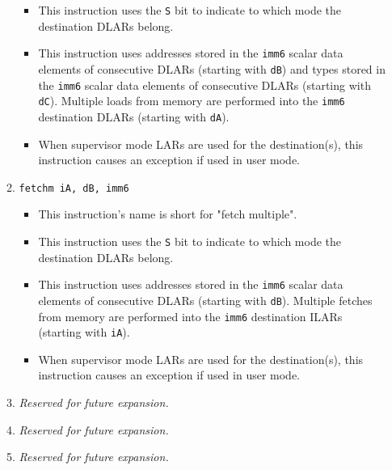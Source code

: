 \documentclass{article}
\begin{document}
\begin{itemize}
\begin{enumerate}
\begin{itemize}
				\item This instruction uses the \texttt{S} bit to indicate
					to which mode the destination DLARs belong.
				\item This instruction uses addresses stored in the
					\texttt{imm6} scalar data elements of consecutive DLARs
					(starting with \texttt{dB}) and types stored in the
					\texttt{imm6} scalar data elements of consecutive DLARs
					(starting with \texttt{dC}). Multiple loads from memory
					are performed into the \texttt{imm6} destination DLARs
					(starting with \texttt{dA}).
				\item When supervisor mode LARs are used for the
					destination(s), this instruction causes an exception if
					used in user mode.
				\end{itemize}

			\item \texttt{fetchm iA, dB, imm6}
				\begin{itemize}
				\item This instruction's name is short for "fetch
					multiple".
				\item This instruction uses the \texttt{S} bit to indicate
					to which mode the destination DLARs belong.
				\item This instruction uses addresses stored in the
					\texttt{imm6} scalar data elements of consecutive DLARs
					(starting with \texttt{dB}). Multiple fetches from
					memory are performed into the \texttt{imm6} destination
					ILARs (starting with \texttt{iA}).
				\item When supervisor mode LARs are used for the
					destination(s), this instruction causes an exception if
					used in user mode.
				\end{itemize}
			\item \textit{Reserved for future expansion.}
			\item \textit{Reserved for future expansion.}
			\item \textit{Reserved for future expansion.}
			\end{enumerate}
		\end{itemize}
		\newpage
\end{document}
